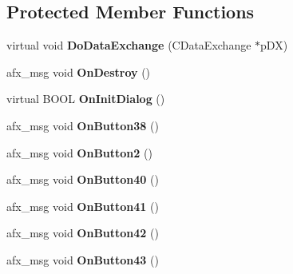 \subsection*{Protected Member Functions}
\begin{DoxyCompactItemize}
\item 
\hypertarget{class_c_pick_dlg_a25c4e4cbe43c68469b57b4a51431a859}{virtual void {\bfseries Do\-Data\-Exchange} (C\-Data\-Exchange $\ast$p\-D\-X)}\label{class_c_pick_dlg_a25c4e4cbe43c68469b57b4a51431a859}

\item 
\hypertarget{class_c_pick_dlg_a1d879b38d5df34998ab3a3ad2f6a80e5}{afx\-\_\-msg void {\bfseries On\-Destroy} ()}\label{class_c_pick_dlg_a1d879b38d5df34998ab3a3ad2f6a80e5}

\item 
\hypertarget{class_c_pick_dlg_a900e706a942458b594b46a0e0e4bec51}{virtual B\-O\-O\-L {\bfseries On\-Init\-Dialog} ()}\label{class_c_pick_dlg_a900e706a942458b594b46a0e0e4bec51}

\item 
\hypertarget{class_c_pick_dlg_a821836d7c218a2b4d6dedc676f9a4862}{afx\-\_\-msg void {\bfseries On\-Button38} ()}\label{class_c_pick_dlg_a821836d7c218a2b4d6dedc676f9a4862}

\item 
\hypertarget{class_c_pick_dlg_a58ecb6e6a1b113a0eb800cf879bbc948}{afx\-\_\-msg void {\bfseries On\-Button2} ()}\label{class_c_pick_dlg_a58ecb6e6a1b113a0eb800cf879bbc948}

\item 
\hypertarget{class_c_pick_dlg_a2b2db375cac9171b4f84dd9330b9fada}{afx\-\_\-msg void {\bfseries On\-Button40} ()}\label{class_c_pick_dlg_a2b2db375cac9171b4f84dd9330b9fada}

\item 
\hypertarget{class_c_pick_dlg_afaec814ed83600470c1654f23a2505fb}{afx\-\_\-msg void {\bfseries On\-Button41} ()}\label{class_c_pick_dlg_afaec814ed83600470c1654f23a2505fb}

\item 
\hypertarget{class_c_pick_dlg_a40f6cdc9d178a6a214a1ba441e59edb6}{afx\-\_\-msg void {\bfseries On\-Button42} ()}\label{class_c_pick_dlg_a40f6cdc9d178a6a214a1ba441e59edb6}

\item 
\hypertarget{class_c_pick_dlg_a32ff3b4300fb1ce43a10a782397a4bff}{afx\-\_\-msg void {\bfseries On\-Button43} ()}\label{class_c_pick_dlg_a32ff3b4300fb1ce43a10a782397a4bff}


\end{DoxyCompactItemize}
